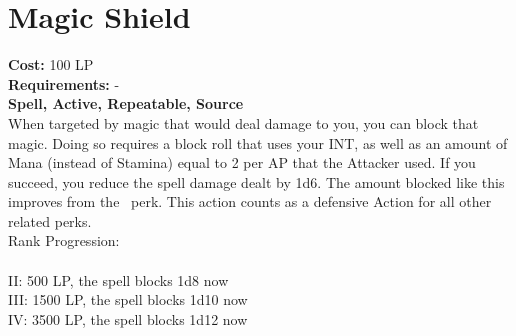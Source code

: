 \section{Magic Shield}\label{spell:magicShield}
\textbf{Cost:} 100 LP\\
\textbf{Requirements:} -\\
\textbf{Spell, Active, Repeatable, Source}\\
When targeted by magic that would deal damage to you, you can block that magic.
Doing so requires a block roll that uses your INT, as well as an amount of Mana (instead of Stamina) equal to 2 per AP that the Attacker used.
If you succeed, you reduce the spell damage dealt by 1d6.
The amount blocked like this improves from the~ perk.
This action counts as a defensive Action for all other related perks.
\\
Rank Progression:\\
\\
II: 500 LP, the spell blocks 1d8 now\\
III: 1500 LP, the spell blocks 1d10 now\\
IV: 3500 LP, the spell blocks 1d12 now\\